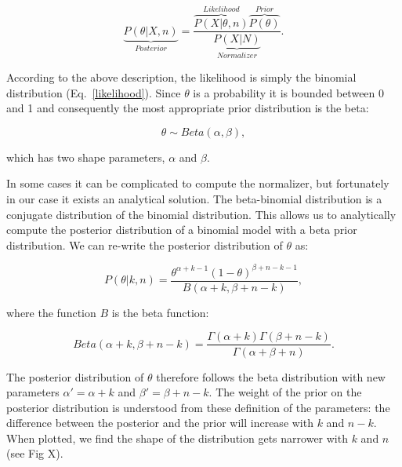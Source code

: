 \documentclass[12pt]{article}
\begin{document}
  \begin{equation}
    \underbrace{P(\theta|X,n)}_{Posterior} = \frac{\overbrace{P(X|\theta,n)}^{Likelihood}\overbrace{P(\theta)}^{Prior}}{\underbrace{P(X|N)}_{Normalizer}} .
    \label{posterior}
  \end{equation}

  According to the above description, the likelihood is simply the binomial distribution (Eq.~\ref{likelihood}). Since $\theta$ is a probability it is bounded between 0 and 1 and consequently the most appropriate prior distribution is the beta:

    \begin{equation}
      \theta \sim Beta(\alpha,\beta) , \label{prior}
    \end{equation}

  \noindent which has two shape parameters, $\alpha$ and $\beta$. 

 In some cases it can be complicated to compute the normalizer, but fortunately in our case it exists an analytical solution. The beta-binomial distribution is a conjugate distribution of the binomial distribution. This allows us to analytically compute the posterior distribution of a binomial model with a beta prior distribution. We can re-write the posterior distribution of $\theta$ as:

  \begin{equation}
    P(\theta|k,n) = \frac{\theta^{\alpha+k-1}(1-\theta)^{\beta+n-k-1}}{B(\alpha+k,\beta+n-k)} , \label{posterior}
  \end{equation}

  \noindent where the function $B$ is the beta function:

  \begin{equation}
    Beta(\alpha+k,\beta+n-k) = \frac{\Gamma(\alpha+k)\Gamma(\beta+n-k)}{\Gamma(\alpha+\beta+n)} . \label{betafunction}
  \end{equation}

  The posterior distribution of $\theta$ therefore follows the beta distribution with new parameters $\alpha'= \alpha+k$ and $\beta'=\beta+n-k$. The weight of the prior on the posterior distribution is understood from these definition of the parameters: the difference between the posterior and the prior will increase with $k$ and $n-k$. When plotted, we find the shape of the distribution gets narrower with $k$ and $n$ (see Fig X). 
%
%
%
\end{document}
